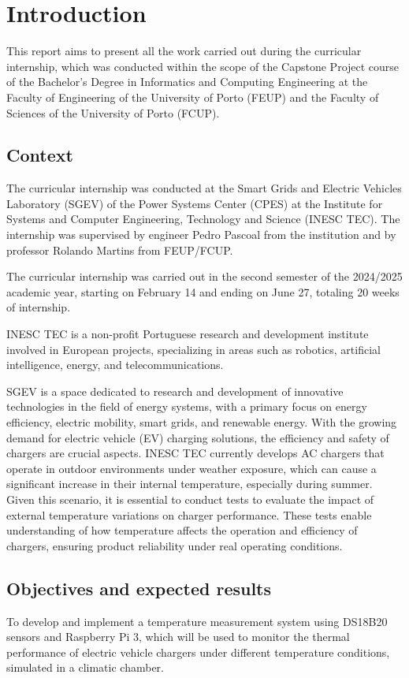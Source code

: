 \section{Introduction}

This report aims to present all the work carried out during the curricular 
internship, which was conducted within the scope of the Capstone Project
course of the Bachelor’s Degree in Informatics and Computing Engineering at 
the Faculty of Engineering of the University of Porto (FEUP) and the Faculty of Sciences of the University of Porto (FCUP).


\subsection{Context}
The curricular internship was conducted at the Smart Grids and Electric Vehicles Laboratory (SGEV) of the Power Systems Center (CPES) at the 
Institute for Systems and Computer Engineering, Technology and Science (INESC TEC). The internship was supervised by engineer Pedro Pascoal from 
the institution and by professor Rolando Martins from FEUP/FCUP.

The curricular internship was carried out in the second semester of the 2024/2025 academic year, starting on 
February 14 and ending on June 27, totaling 20 weeks of internship.

INESC TEC is a non-profit Portuguese research and development institute 
involved in European projects, specializing in areas such as robotics, 
artificial intelligence, energy, and telecommunications.

SGEV is a space dedicated to research and development of innovative technologies in the field of energy systems, with a primary focus on energy 
efficiency, electric mobility, smart grids, and renewable energy.
With the growing demand for electric vehicle (EV) charging solutions, the efficiency and safety of chargers are crucial aspects. INESC TEC currently develops 
AC chargers that operate in outdoor environments under weather exposure, which can cause a significant increase in their internal temperature, 
especially during summer. Given this scenario, it is essential to conduct tests to evaluate the impact of external temperature variations on 
charger performance. These tests enable understanding of how temperature affects the operation and efficiency of chargers, ensuring 
product reliability under real operating conditions.

\subsection{Objectives and expected results}
To develop and implement a temperature measurement system using DS18B20 sensors and Raspberry Pi 3, which will be used to monitor the thermal 
performance of electric vehicle chargers under different temperature conditions, simulated in a climatic chamber.

